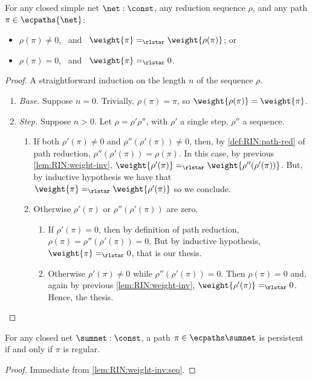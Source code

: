 \begin{lemma}\label{lem:RIN:weight-inv:seq}
For any closed simple net $\net:\const$,
any reduction sequence $\rho$, and
any path $\pi \in \ecpaths{\net}$:
\begin{itemize}
  \item $\rho(\pi) \neq 0$, \  and \ 
    $\weight{\pi} =_\rlstar \weight{\rho(\pi)}$; or
  \item $\rho(\pi) = 0$, \ and \ 
    $\weight{\pi} =_\rlstar 0$.
\end{itemize}
\end{lemma}

\begin{proof}
A straightforward induction on the length $n$ of the sequence $\rho$.
\begin{enumerate}
\item \textit{Base.}
  Suppose $n=0$.
  Trivially, $\rho(\pi) = \pi$, so $\weight{\rho(\pi)} = \weight{\pi}$.
\item \textit{Step.}
  Suppose $n>0$.
  Let $\rho = \rho' \rho''$, with 
    $\rho'$ a single step,
    $\rho''$ a sequence.
  \begin{enumerate}
  \item If both $\rho'(\pi) \neq 0$ and $\rho''(\rho'(\pi)) \neq 0$, then, by 
    \autoref{def:RIN:path-red} of path reduction, 
    $\rho''(\rho'(\pi)) = \rho(\pi)$.
    In this case, by previous \autoref{lem:RIN:weight-inv},
    $\weight{\rho'(\pi)} =_\rlstar \weight{\rho''(\rho'(\pi))}$.
    But, by inductive hypothesis we have that
     $ \weight{\pi} =_\rlstar \weight{\rho'(\pi)}$
    so we conclude.
  \item Otherwise $\rho'(\pi)$ or $\rho''(\rho'(\pi))$ are zero.
    \begin{enumerate}
    \item If $\rho'(\pi) = 0$, then by definition of path 
      reduction, $\rho(\pi) = \rho''(\rho'(\pi)) = 0$.
      But by inductive hypothesis, $\weight{\pi} =_\rlstar 0$, that is our 
      thesis.
    \item Otherwise $\rho'(\pi) \neq 0$ while $\rho''(\rho'(\pi)) = 0$.
      Then $\rho(\pi) = 0$ and, again by previous \autoref{lem:RIN:weight-inv}, 
      $\weight{\rho'(\pi)} =_\rlstar 0$.
      Hence, the thesis.
    \end{enumerate}
\end{enumerate}
\end{enumerate}
\end{proof}

\begin{theorem}
\label{thm:RIN:regular}
For any closed net $\sumnet: \const$, a path $\pi \in \ecpaths\sumnet$ is 
persistent if and only if $\pi$ is regular.
\end{theorem}
\begin{proof}
  Immediate from \autoref{lem:RIN:weight-inv:seq}.
\end{proof}

